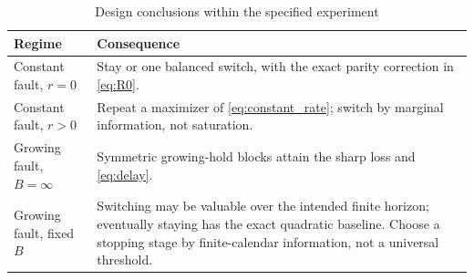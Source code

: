 \begin{table}[t]
\caption{Design conclusions within the specified experiment}
\label{tab:design}\centering\small
\begin{tabular}{p{}p{}}
\toprule
Regime & Consequence\\\midrule
Constant fault, $r=0$ & Stay or one balanced switch, with the exact parity correction in \eqref{eq:R0}.\\
Constant fault, $r>0$ & Repeat a maximizer of \eqref{eq:constant_rate}; switch by marginal information, not saturation.\\
Growing fault, $B=\infty$ & Symmetric growing-hold blocks attain the sharp loss and \eqref{eq:delay}.\\
Growing fault, fixed $B$ & Switching may be valuable over the intended finite horizon; eventually staying has the exact quadratic baseline. Choose a stopping stage by finite-calendar information, not a universal threshold.\\\bottomrule
\end{tabular}
\end{table}

